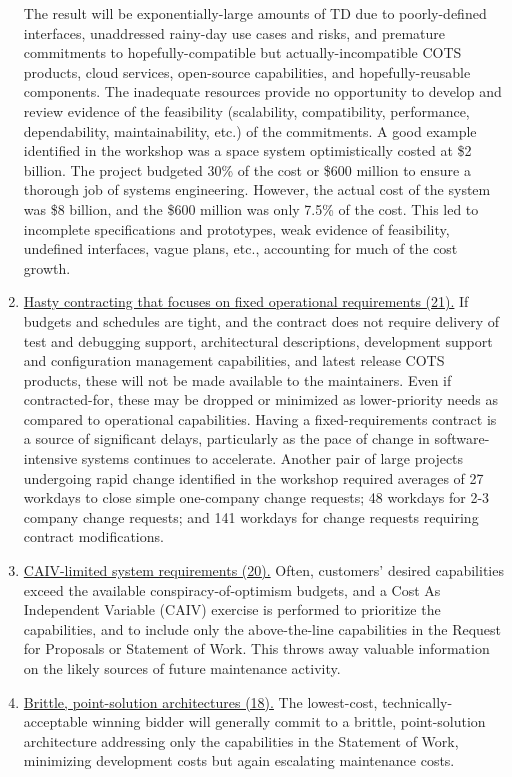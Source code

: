 \begin{enumerate}
	The result will be exponentially-large amounts of TD due to poorly-defined interfaces, unaddressed rainy-day use cases and risks, and premature commitments to hopefully-compatible but actually-incompatible COTS products, cloud services, open-source capabilities, and hopefully-reusable components.
	The inadequate resources provide no opportunity to develop and review evidence of the feasibility (scalability, compatibility, performance, dependability, maintainability, etc.) of the commitments.
	A good example identified in the workshop was a space system optimistically costed at \$2 billion.
	The project budgeted 30\% of the cost or \$600 million to ensure a thorough job of systems engineering.
	However, the actual cost of the system was \$8 billion, and the \$600 million was only 7.5\% of the cost.
	This led to incomplete specifications and prototypes, weak evidence of feasibility, undefined interfaces, vague plans, etc., accounting for much of the cost growth.
	\item \ul{Hasty contracting that focuses on fixed operational requirements (21).}
	If budgets and schedules are tight, and the contract does not require delivery of test and debugging support, architectural descriptions, development support and configuration management capabilities, and latest release COTS products, these will not be made available to the maintainers.
	Even if contracted-for, these may be dropped or minimized as lower-priority needs as compared to operational capabilities.
	Having a fixed-requirements contract is a source of significant delays, particularly as the pace of change in software-intensive systems continues to accelerate.
	Another pair of large projects undergoing rapid change identified in the workshop required averages of 27 workdays to close simple one-company change requests; 48 workdays for 2-3 company change requests; and 141 workdays for change requests requiring contract modifications.
	\item  \ul{CAIV-limited system requirements (20).}
	Often, customers' desired capabilities exceed the available conspiracy-of-optimism budgets, and a Cost As Independent Variable (CAIV) exercise is performed to prioritize the capabilities, and to include only the above-the-line capabilities in the Request for Proposals or Statement of Work.
	This throws away valuable information on the likely sources of future maintenance activity.
	\item  \ul{Brittle, point-solution architectures (18).}
	The lowest-cost, technically-acceptable winning bidder will generally commit to a brittle, point-solution architecture addressing only the capabilities in the Statement of Work, minimizing development costs but again escalating maintenance costs. 

\end{enumerate}
